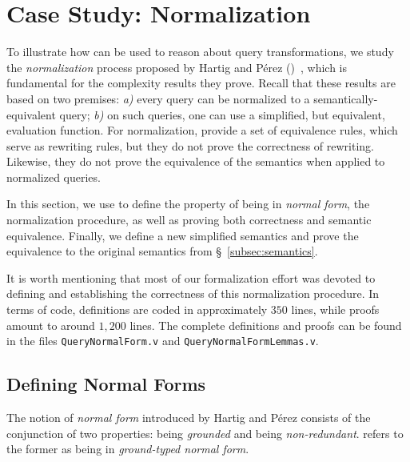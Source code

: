 \section{Case Study: Normalization}\label{sec:norm}

To illustrate how \gcoql can be used to reason about query transformations, we study the {\em normalization} process proposed by Hartig and Pérez (\HP)~\cite{gqlph}, which is fundamental for the complexity results they prove.
%
Recall that these results are based on two premises: {\em a)} every query can be normalized to a semantically-equivalent query; {\em b)} on such queries, one can use a simplified, but equivalent, evaluation function. For normalization,  \HP provide a set of equivalence rules, which serve as rewriting rules, but they do not prove the correctness of rewriting. Likewise, they do not prove the equivalence of the semantics when applied to normalized queries.

In this section, we use \gcoql to define the property of being in \textit{normal form}, the normalization procedure, as well as proving both correctness and semantic equivalence. Finally, we define a new simplified semantics and prove the equivalence to the original semantics from \S~\ref{subsec:semantics}.

It is worth mentioning that most of our formalization effort was devoted to defining and establishing the correctness of this normalization procedure. In terms of code, definitions are coded in approximately $350$ lines, while proofs amount to around $1,200$ lines. The complete definitions and proofs can be found in the files \texttt{QueryNormalForm.v} and \texttt{QueryNormalFormLemmas.v}. 

\subsection{Defining Normal Forms}

The notion of \textit{normal form} introduced by Hartig and Pérez consists of the conjunction of two properties: being \textit{grounded} and being \textit{non-redundant}.
\HP refers to the former as being in \textit{ground-typed normal form}. %

